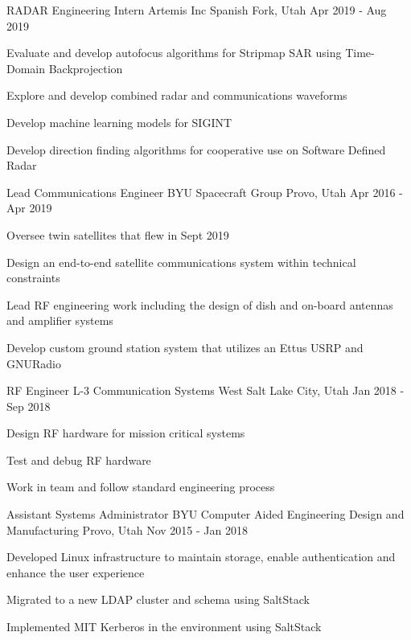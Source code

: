 \begin{cventries}
    \cventry
    {RADAR Engineering Intern} %
    {Artemis Inc} %
    {Spanish Fork, Utah} %
    {Apr 2019 - Aug 2019} %
    {
        \begin{cvitems} %
        \item {Evaluate and develop autofocus algorithms for Stripmap SAR using Time-Domain Backprojection}
        \item {Explore and develop combined radar and communications waveforms}
        \item {Develop machine learning models for SIGINT}
        \item {Develop direction finding algorithms for cooperative use on Software Defined Radar}
        \end{cvitems}
    }

    \cventry
    {Lead Communications Engineer} %
    {BYU Spacecraft Group} %
    {Provo, Utah} %
    {Apr 2016 - Apr 2019} %
    {
        \begin{cvitems} %
        \item {Oversee twin satellites that flew in Sept 2019}
        \item {Design an end-to-end satellite communications system within technical constraints}
        \item {Lead RF engineering work including the design of dish and on-board antennas and amplifier systems}
        \item {Develop custom ground station system that utilizes an Ettus USRP and GNURadio}
        \end{cvitems}
    }

    \cventry
    {RF Engineer} %
    {L-3 Communication Systems West} %
    {Salt Lake City, Utah} %
    {Jan 2018 - Sep 2018} %
    {
        \begin{cvitems} %
        \item {Design RF hardware for mission critical systems}
        \item {Test and debug RF hardware}
        \item {Work in team and follow standard engineering process}
        \end{cvitems}
    }

    \cventry
    {Assistant Systems Administrator} %
    {BYU Computer Aided Engineering Design and Manufacturing} %
    {Provo, Utah} %
    {Nov 2015 - Jan 2018} %
    {
        \begin{cvitems} %
        \item {Developed Linux infrastructure to maintain storage, enable authentication and enhance the user experience}
        \item {Migrated to a new LDAP cluster and schema using SaltStack}
        \item {Implemented MIT Kerberos in the environment using SaltStack}
        \end{cvitems}
    }


\end{cventries}
